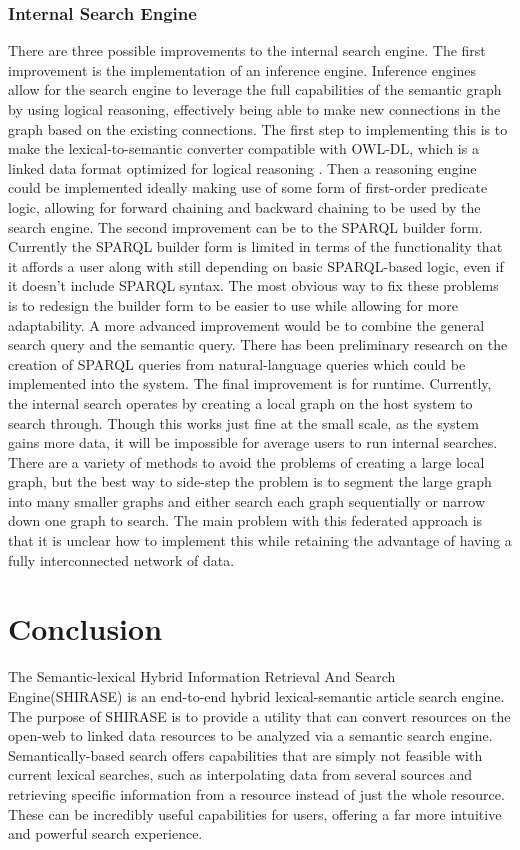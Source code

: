 \documentclass[12pt]{article}
\begin{document}
	\subsubsection{Internal Search Engine}
	\quad There are three possible improvements to the internal search engine. The first improvement is the implementation of an inference engine. Inference engines allow for the search engine to leverage the full capabilities of the semantic graph by using logical reasoning, effectively being able to make new connections in the graph based on the existing connections. The first step to implementing this is to make the lexical-to-semantic converter compatible with OWL-DL, which is a linked data format optimized for logical reasoning \cite{mcguinness2004owl}. Then a reasoning engine could be implemented ideally making use of some form of first-order predicate logic, allowing for forward chaining and backward chaining to be used by the search engine. The second improvement can be to the SPARQL builder form. Currently the SPARQL builder form is limited in terms of the functionality that it affords a user along with still depending on basic SPARQL-based logic, even if it doesn’t include SPARQL syntax. The most obvious way to fix these problems is to redesign the builder form to be easier to use while allowing for more adaptability. A more advanced improvement would be to combine the general search query and the semantic query. There has been preliminary research on the creation of SPARQL queries from natural-language queries which could be implemented into the system\cite{yahya2012natural}. The final improvement is for runtime. Currently, the internal search operates by creating a local graph on the host system to search through. Though this works just fine at the small scale, as the system gains more data, it will be impossible for average users to run internal searches. There are a variety of methods to avoid the problems of creating a large local graph, but the best way to side-step the problem is to segment the large graph into many smaller graphs and either search each graph sequentially or narrow down one graph to search. The main problem with this federated approach is that it is unclear how to implement this while retaining the advantage of having a fully interconnected network of data.
	
	\section{Conclusion}
	
	\quad The Semantic-lexical Hybrid Information Retrieval And Search Engine(SHIRASE) is an end-to-end hybrid lexical-semantic article search engine. The purpose of SHIRASE is to provide a utility that can convert resources on the open-web to linked data resources to be analyzed via a semantic search engine. Semantically-based search offers capabilities that are simply not feasible with current lexical searches, such as interpolating data from several sources and retrieving specific information from a resource instead of just the whole resource. These can be incredibly useful capabilities for users, offering a far more intuitive and powerful search experience.
	 
\end{document}
